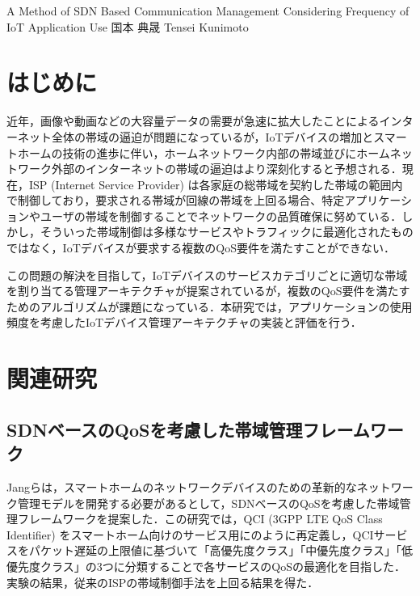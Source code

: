 \documentclass[a4paper,10pt,twocolumn,uplatex]{jsarticle}
\date{11}
\begin{document}
{A Method of SDN Based Communication Management Considering Frequency of IoT Application Use}
{国本 典晟}
{Tensei Kunimoto}

\section{はじめに}
近年，画像や動画などの大容量データの需要が急速に拡大したことによるインターネット全体の帯域の逼迫が問題になっているが，IoTデバイスの増加とスマートホームの技術の進歩に伴い，ホームネットワーク内部の帯域並びにホームネットワーク外部のインターネットの帯域の逼迫はより深刻化すると予想される．現在，ISP (Internet Service Provider) は各家庭の総帯域を契約した帯域の範囲内で制御しており，要求される帯域が回線の帯域を上回る場合、特定アプリケーションやユーザの帯域を制御することでネットワークの品質確保に努めている．しかし，そういった帯域制御は多様なサービスやトラフィックに最適化されたものではなく，IoTデバイスが要求する複数のQoS要件を満たすことができない．\par
この問題の解決を目指して，IoTデバイスのサービスカテゴリごとに適切な帯域を割り当てる管理アーキテクチャが提案されているが，複数のQoS要件を満たすためのアルゴリズムが課題になっている．本研究では，アプリケーションの使用頻度を考慮したIoTデバイス管理アーキテクチャの実装と評価を行う．\par

\section{関連研究}

\subsection{SDNベースのQoSを考慮した帯域管理フレームワーク}
Jangらは，スマートホームのネットワークデバイスのための革新的なネットワーク管理モデルを開発する必要があるとして，SDNベースのQoSを考慮した帯域管理フレームワークを提案した\cite{framework}．この研究では，QCI (3GPP LTE QoS Class Identifier) をスマートホーム向けのサービス用にのように再定義し，QCIサービスをパケット遅延の上限値に基づいて「高優先度クラス」「中優先度クラス」「低優先度クラス」の3つに分類することで各サービスのQoSの最適化を目指した．実験の結果，従来のISPの帯域制御手法を上回る結果を得た．\par
\end{document}
